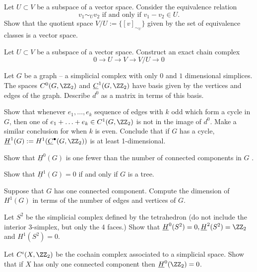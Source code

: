 \begin{exercise}
	Let $U\subset V$ be a subspace of a vector space. Consider the equivalence relation 
	\[v_1\sim_U v_2 \text{  if and only if  } v_1-v_2\in U.\]
	Show that the quotient space $V/U:=\{[v]_{\sim_U}\}$ given by the set of equivalence classes is a vector space.	
\end{exercise}
\begin{exercise}
	Let $U\subset V$ be a subspace of a vector space. Construct an exact chain complex
	\[0 \to U\to V\to V/U\to 0\]
\end{exercise}
\begin{exercise}
	Let $G$ be a graph -- a simplicial complex with only $0$ and $1$ dimensional simplices. The spaces $ C^0(G, \ZZ_2)$ and $ \underline C^1(G, \ZZ_2)$ have basis given by the vertices and edges of the graph. Describe $d^0$ as a matrix in terms of this basis. 
\end{exercise}
\begin{exercise}
	Show that whenever $e_1, \ldots, e_k$ sequence of edges with $k$ odd which form a cycle in $G$, then one of $e_1+\ldots+ e_k\in C^1(G, \ZZ_2)$ is not in the image of $d^0$. 
	Make a similar conclusion for when $k$ is even. 
	Conclude that if $G$ has a cycle, $\underline H^1(G):=H^1(\underline C^\bullet(G, \ZZ_2))$ is at least 1-dimensional.
\end{exercise}
\begin{exercise}
	Show that $\underline H^0(G)$ is one fewer than the number of connected components in $G$ . 
\end{exercise}
\begin{exercise}
	Show that $\underline H^1(G)=0$ if and only if $G$ is a tree. 
\end{exercise}
\begin{exercise}
	Suppose that $G$ has one connected component. Compute the dimension of $H^1(G)$ in terms of the number of edges and vertices of $G$.  
\end{exercise}
\begin{exercise}
	Let $S^2$ be the simplicial complex defined by the tetrahedron (do not include the interior 3-simplex, but only the 4 faces.) Show that $\underline H^0(S^2)=0, \underline H^2(S^2)=\ZZ_2$ and $H^1(S^2)=0$. 
\end{exercise}
\begin{exercise}
	Let $C^i(X, \ZZ_2)$ be the cochain complex associated to a simplicial space. Show that if $X$ has only one connected component then $\underline H^0(\ZZ_2)= 0$. 
\end{exercise}
